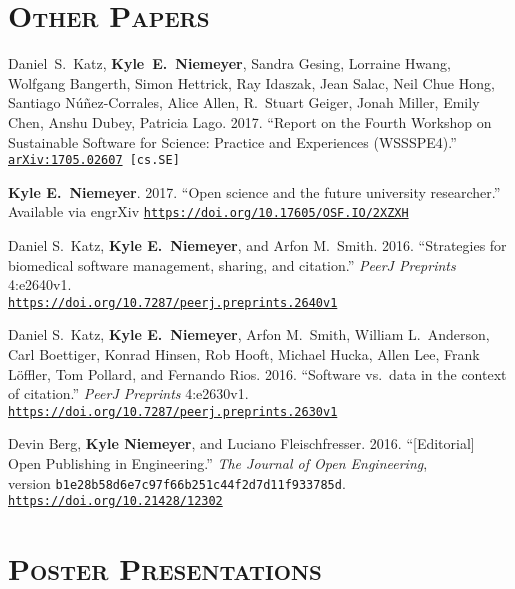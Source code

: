 \documentclass[margin,line,11pt]{res}
\makeatletter
\newlength{\bibhang}
\newlength{\bibsep}
 {\@listi \global\bibsep\itemsep \global\advance\bibsep by\parsep}
\newenvironment{bibenum*}
  {\renewcommand\labelenumi{\theenumi.}%
   \etaremune[
     topsep=0pt,
     itemsep=\bibsep,
     parsep=0pt,partopsep=0pt,
     itemindent=-\bibhang,
     leftmargin={\bibhang+\widthof{[999]}}]}
  {\endetaremune}
\newcommand*{\doi}[1]{\href{https://doi.org/#1}{\nolinkurl{https://doi.org/#1}}}
\makeatother
\begin{document}
\begin{resume}
\section{\textsc{Other Papers}}

\begin{bibenum*}

\item Daniel~S.~Katz, \textbf{Kyle~E.~Niemeyer}, Sandra Gesing, Lorraine Hwang,
Wolfgang Bangerth, Simon Hettrick, Ray Idaszak, Jean Salac, Neil Chue Hong,
Santiago N\'u\~nez-Corrales, Alice Allen, R.~Stuart Geiger, Jonah Miller,
Emily Chen, Anshu Dubey, Patricia Lago.
2017.
``Report on the Fourth Workshop on Sustainable Software for Science: Practice and Experiences (WSSSPE4).''
{\tt \href{http://arxiv.org/abs/1705.02607}{arXiv:1705.02607} [cs.SE]}

\item \textbf{Kyle E.~Niemeyer}.
2017.
``Open science and the future university researcher.''
Available via engrXiv \doi{10.17605/OSF.IO/2XZXH}

\item Daniel S.\ Katz, \textbf{Kyle E.~Niemeyer}, and Arfon M.\ Smith.
2016.
``Strategies for biomedical software management, sharing, and citation.''
\textit{PeerJ Preprints} 4:e2640v1. \\
\doi{10.7287/peerj.preprints.2640v1}

\item Daniel S.\ Katz, \textbf{Kyle E.~Niemeyer}, Arfon M.\ Smith, William L.\ Anderson,
Carl Boettiger, Konrad Hinsen, Rob Hooft, Michael Hucka, Allen Lee, Frank Löffler,
Tom Pollard, and Fernando Rios.
2016.
``Software vs.\ data in the context of citation.''
\textit{PeerJ Preprints} 4:e2630v1.
\doi{10.7287/peerj.preprints.2630v1}

\item Devin Berg, \textbf{Kyle Niemeyer}, and Luciano Fleischfresser.
2016.
``[Editorial] Open Publishing in Engineering.''
\textit{The Journal of Open Engineering}, \\
version \texttt{b1e28b58d6e7c97f66b251c44f2d7d11f933785d}.
\doi{10.21428/12302}

\end{bibenum*}

\section{\textsc{Poster Presentations}}


\end{resume}
\end{document}
